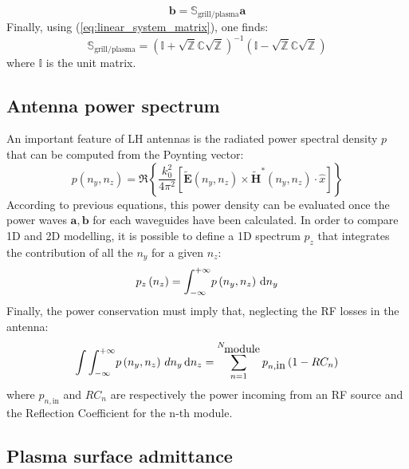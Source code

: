 \begin{equation}
\mathbf{b}=\mathbb{S}_{\mbox{grill/plasma}}\mathbf{a}\label{eq:Sgrillplasma_def}
\end{equation}
Finally, using (\ref{eq:linear_system_matrix}), one finds:
\begin{equation}
\mathbb{S}_{\mbox{grill/plasma}}=\left(\mathbb{I}+\sqrt{\mathbb{Z}}\mathbb{C}\sqrt{\mathbb{Z}}\right)^{-1}\left(\mathbb{I}-\sqrt{\mathbb{Z}}\mathbb{C}\sqrt{\mathbb{Z}}\right)
\end{equation}
where $\mathbb{I}$ is the unit matrix.

\subsection{Antenna power spectrum}
An important feature of LH antennas is the radiated power spectral density $p$ that can be computed from the Poynting vector: 
\begin{equation} 
 p
\left(n_{y},n_{z}\right)
=\Re\left\{ \frac{k_{0}^{2}}{4\pi^{2}}\left[\tilde{\mathbf{E}}\left(n_{y},n_{z}\right)\times\tilde{\mathbf{H}}^{*}\left(n_{y},n_{z}\right)\cdot\widehat{x}\right]\right\} 
\label{eq:power_spectrum_2D}
\end{equation}
According to previous equations, this power density can be evaluated once the power waves $\mathbf{a},\mathbf{b}$ for each waveguides have been calculated. In order to compare 1D and 2D modelling, it is possible to define a 1D spectrum $p_{z}$ that integrates the contribution of all the $n_{y}$ for a given $n_{z}$:
\begin{equation}
p_{z}\left(n_{z}\right)
=
\int_{-\infty}^{+\infty}\! 
p\left(n_{y},n_{z}\right)\, {\mathrm{d}} n_{y}
\label{eq:power_spectrum_1D}
\end{equation}
Finally, the power conservation must imply that, neglecting the RF
losses in the antenna:
\begin{equation}
\int\int_{-\infty}^{+\infty}\! 
p\left(n_{y},n_{z}\right)\, dn_{y}\, {\mathrm{d}} n_{z}
=
\sum_{n=1}^{N_{\mbox{module}}}p_{n,\mbox{in}}\left(1-RC_{n}\right)
\label{eq:spectrum_power_conservation}
\end{equation}
where $p_{n,\mbox{in}}$ and $RC_{n}$ are respectively the power incoming from an RF source and the Reflection Coefficient for the n-th module. 


\subsection{Plasma surface admittance}\label{sec:surface_admittance}


